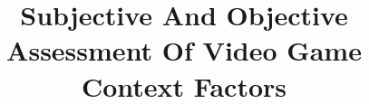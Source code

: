 \documentclass[conference]{IEEEtran}
\begin{document}
\title{Subjective And Objective Assessment Of Video Game Context Factors}

%


\maketitle










\printbibliography

\balance
\end{document}
